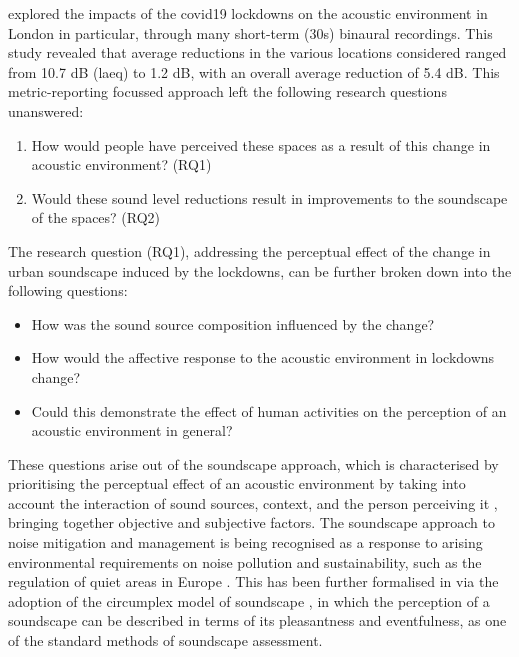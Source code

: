  \citet{Aletta2020Assessing} explored the impacts of the \gls{covid19} lockdowns on the acoustic environment in London in particular, through many short-term (30s) binaural recordings. This study revealed that average reductions in the various locations considered ranged from 10.7 dB (\gls{laeq}) to 1.2 dB, with an overall average reduction of 5.4 dB. This metric-reporting focussed approach left the following research questions unanswered:
 \begin{enumerate}
   \item How would people have perceived these spaces as a result of this change in acoustic environment? (RQ1)
   \item Would these sound level reductions result in improvements to the soundscape of the spaces? (RQ2)
 \end{enumerate}

 The  research question (RQ1), addressing the perceptual effect of the change in urban soundscape induced by the lockdowns, can be further broken down into the following questions:

 \begin{itemize}
   \item How was the sound source composition influenced by the change?
   \item How would the affective response to the acoustic environment in lockdowns change?
   \item Could this demonstrate the effect of human activities on the perception of an acoustic environment in general?
 \end{itemize}

 These questions arise out of the soundscape approach, which is characterised by prioritising the perceptual effect of an acoustic environment by taking into account the interaction of sound sources, context, and the person perceiving it \citep{ISO12913_1_2014IOS} , bringing together objective and subjective factors. The soundscape approach to noise mitigation and management is being recognised as a response to arising environmental requirements on noise pollution and sustainability, such as the regulation of quiet areas in Europe \citep{EEA2020Environmental, Aletta2018Towards} . This has been further formalised in \citet{ISO12913_2_2018IOS} via the adoption of the circumplex model of soundscape \citep{Axelsson2010principal}, in which the perception of a soundscape can be described in terms of its pleasantness and eventfulness, as one of the standard methods of soundscape assessment.

